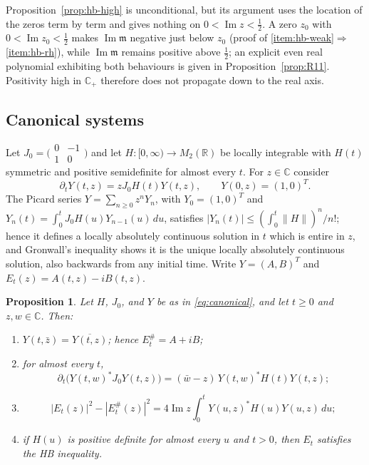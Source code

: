\documentclass[11pt]{amsart}
\theoremstyle{plain}
\newtheorem{proposition}[theorem]{Proposition}
\theoremstyle{definition}
\theoremstyle{remark}
\numberwithin{equation}{section}
\newcommand{\C}{\mathbb{C}}
\newcommand{\R}{\mathbb{R}}
\newcommand{\Cp}{\mathbb{C}_{+}}
\DeclareMathOperator{\Ima}{Im}
\renewcommand{\Im}{\Ima}
\begin{document}
Proposition~\ref{prop:hb-high} is unconditional, but its argument uses
the location of the zeros term by term and gives nothing on
$0<\Im z<\tfrac12$. A zero $z_0$ with $0<\Im z_0<\tfrac12$ makes
$\Im\mathfrak m$ negative just below $z_0$ (proof of
\ref{item:hb-weak}$\Rightarrow$\ref{item:hb-rh}), while $\Im\mathfrak m$
remains
positive above $\tfrac12$; an explicit even real polynomial exhibiting
both behaviours is given in Proposition~\ref{prop:R11}. Positivity high
in $\Cp$ therefore does not propagate down to the real axis.

\subsection{Canonical systems}\label{subsec:canonical}

Let $J_0=\bigl(\begin{smallmatrix}0&-1\\1&0\end{smallmatrix}\bigr)$
and let $H:[0,\infty)\to M_2(\R)$ be locally integrable with $H(t)$
symmetric and positive semidefinite for almost every $t$. For $z\in\C$
consider
\begin{equation}\label{eq:canonical}
\partial_tY(t,z)=zJ_0H(t)Y(t,z),\qquad Y(0,z)=(1,0)^T.
\end{equation}
The Picard series $Y=\sum_{n\ge0}z^nY_n$, with $Y_0=(1,0)^T$ and
$Y_n(t)=\int_0^tJ_0H(u)Y_{n-1}(u)\,du$, satisfies
$|Y_n(t)|\le(\int_0^t\|H\|)^n/n!$; hence it defines a locally
absolutely continuous solution in $t$ which is entire in $z$, and
Gronwall's inequality shows it is the unique locally absolutely
continuous solution, also backwards from any initial time. Write
$Y=(A,B)^T$ and $E_t(z)=A(t,z)-iB(t,z)$.

\begin{proposition}\label{prop:canonical}
Let $H$, $J_0$, and $Y$ be as in \eqref{eq:canonical}, and let
$t\ge0$ and $z,w\in\C$. Then:
\begin{enumerate}[label=(\roman*)]
\item\label{item:can-real} $Y(t,\bar z)=\overline{Y(t,z)}$; hence
  $E_t^\#=A+iB$;
\item\label{item:can-lagrange} for almost every $t$,
  \begin{equation}\label{eq:lagrange}
  \partial_t\bigl(Y(t,w)^*J_0Y(t,z)\bigr)
  =(\bar w-z)\,Y(t,w)^*H(t)Y(t,z);
  \end{equation}
\item\label{item:can-hb}
  \begin{equation}\label{eq:can-hb}
  |E_t(z)|^2-|E_t^\#(z)|^2
  =4\Im z\int_0^tY(u,z)^*H(u)Y(u,z)\,du;
  \end{equation}
\item\label{item:can-pos} if $H(u)$ is positive definite for almost
  every $u$ and $t>0$, then $E_t$ satisfies the HB inequality.
\end{enumerate}
\end{proposition}
\end{document}
